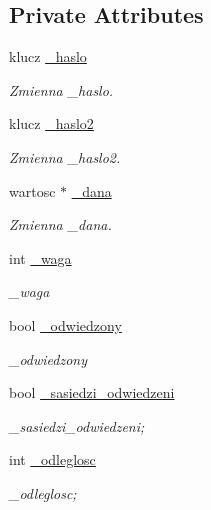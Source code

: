 \subsection*{Private Attributes}
\begin{DoxyCompactItemize}
\item 
klucz \hyperlink{class_element_a5adc6eefcea4421879ba7f69960f3d2d}{\+\_\+haslo}
\begin{DoxyCompactList}\small\item\em Zmienna \+\_\+haslo. \end{DoxyCompactList}\item 
klucz \hyperlink{class_element_a0428d3ef2e3ba02dc3c116f900b41f7f}{\+\_\+haslo2}
\begin{DoxyCompactList}\small\item\em Zmienna \+\_\+haslo2. \end{DoxyCompactList}\item 
wartosc $\ast$ \hyperlink{class_element_a07fc2be998aaef31c5283e4014420f75}{\+\_\+dana}
\begin{DoxyCompactList}\small\item\em Zmienna \+\_\+dana. \end{DoxyCompactList}\item 
int \hyperlink{class_element_a92ee233e04730ab987cf1082cfcd43cd}{\+\_\+waga}
\begin{DoxyCompactList}\small\item\em \+\_\+waga \end{DoxyCompactList}\item 
bool \hyperlink{class_element_a78bb5917b236378b74436d5c2471d724}{\+\_\+odwiedzony}
\begin{DoxyCompactList}\small\item\em \+\_\+odwiedzony \end{DoxyCompactList}\item 
bool \hyperlink{class_element_ac615eb72456973cc328febd494ebfa5f}{\+\_\+sasiedzi\+\_\+odwiedzeni}
\begin{DoxyCompactList}\small\item\em \+\_\+sasiedzi\+\_\+odwiedzeni; \end{DoxyCompactList}\item 
int \hyperlink{class_element_a206cb0915829707e829395aa1c320eca}{\+\_\+odleglosc}
\begin{DoxyCompactList}\small\item\em \+\_\+odleglosc; \end{DoxyCompactList}\item 

\end{DoxyCompactItemize}
